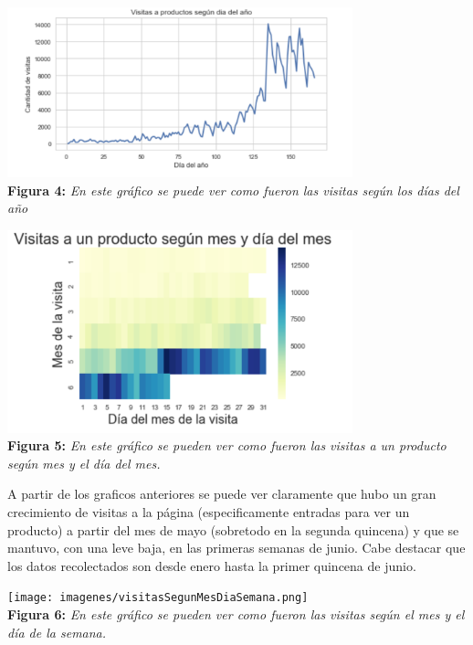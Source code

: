 \documentclass[titlepage,a4paper]{article}
\begin{document}
	\begin{center}
	\includegraphics[width=10cm]{VisitasAProductosSegunDiaAnio.jpg}\\
	\textbf{Figura 4:}  \textit{En este gráfico se puede ver como fueron las visitas según los días del año  }
	\end{center}

	\begin{center}
	\includegraphics[width=10cm]{visitasSegunmesDiaMes.jpg}\\
	\textbf{Figura 5:}  \textit{En este gráfico se pueden ver como fueron las visitas a un producto según mes y el día del mes.   }
	
	\end{center}

		A partir de los graficos anteriores se puede ver claramente que hubo un gran crecimiento de visitas a la página (especificamente entradas para ver un producto) a partir del mes de mayo (sobretodo en la segunda quincena) y que se mantuvo, con una leve baja, en las primeras semanas de junio. 
	Cabe destacar que los datos recolectados son desde enero hasta la primer quincena de junio.
	
	
	\begin{center}
	\texttt{[image: imagenes/visitasSegunMesDiaSemana.png]}\\
	\textbf{Figura 6:}  \textit{En este gráfico se pueden ver como fueron las visitas según el mes y el día de la semana.    }
	\end{center}
	

	
	
	
	
\end{document}
